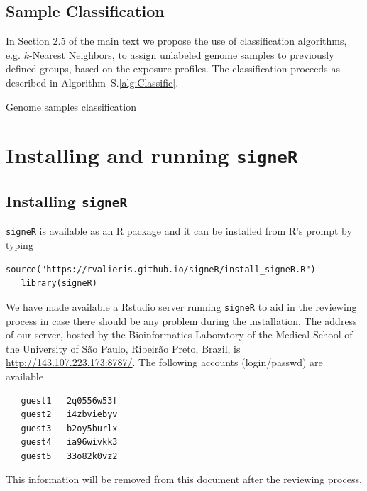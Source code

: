 \documentclass[11pt]{amsart}
\makeatletter
\def\BState{\State\hskip-\ALG@thistlm}
\theoremstyle{definition}
\makeatother
\begin{document}
\subsection{Sample Classification}
In Section 2.5 of the main text we propose the use of classification
algorithms, e.g. $k$-Nearest Neighbors, to assign unlabeled genome
samples to previously defined groups, based on the exposure profiles.
The classification proceeds as described in
Algorithm~S.\ref{alg:Classific}.

\begin{algorithm}
\caption{Genome samples classification}\label{alg:Classific}
\end{algorithm}


\section{Installing and running \texttt{signeR}}
\subsection{Installing \texttt{signeR}}
\texttt{signeR} is available as an R package and it can be installed
from R's prompt by typing
\begin{lstlisting}[]
   source("https://rvalieris.github.io/signeR/install_signeR.R")
   library(signeR)
\end{lstlisting}

We have made available a Rstudio server
running \texttt{signeR} to aid in the reviewing process  in case there
should be any problem during the installation. The address of our
server, hosted by the Bioinformatics Laboratory of the Medical School 
of the University of S\~ao Paulo, Ribeir\~ao Preto, Brazil, is 
\url{http://143.107.223.173:8787/}. The following accounts
(login/passwd) are available
\begin{lstlisting}
   guest1   2q0556w53f
   guest2   i4zbviebyv
   guest3   b2oy5burlx
   guest4   ia96wivkk3
   guest5   33o82k0vz2
\end{lstlisting}
This information will be removed from this document after the
reviewing process. 
\end{document}
